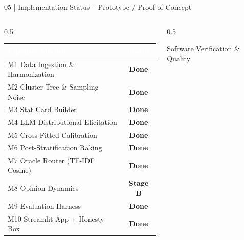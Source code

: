 \documentclass[10pt,aspectratio=169]{beamer}
\begin{document}
\begin{frame}{05 | Implementation Status -- Prototype / Proof-of-Concept}
    \scriptsize
    \begin{columns}[T]
        \begin{column}{0.5\textwidth}
            \renewcommand{\arraystretch}{1.1}
            \begin{table}
            \begin{tabularx}{\textwidth}{@{} >{\raggedright\arraybackslash}X c @{}}
                \toprule
                \rowcolor{HeaderNavy} \textcolor{white}{\textbf{Pipeline Module}} & \textcolor{white}{\textbf{Status}} \\
                \midrule
                \rowcolor{RowAlt} M1 Data Ingestion \& Harmonization & {\color{TLGreen}\textbf{Done}} \\
                M2 Cluster Tree \& Sampling Noise & {\color{TLGreen}\textbf{Done}} \\
                \rowcolor{RowAlt} M3 Stat Card Builder & {\color{TLGreen}\textbf{Done}} \\
                M4 LLM Distributional Elicitation & {\color{TLGreen}\textbf{Done}} \\
                \rowcolor{RowAlt} M5 Cross-Fitted Calibration & {\color{TLGreen}\textbf{Done}} \\
                M6 Post-Stratification Raking & {\color{TLGreen}\textbf{Done}} \\
                \rowcolor{RowAlt} M7 Oracle Router (TF-IDF Cosine) & {\color{TLGreen}\textbf{Done}} \\
                M8 Opinion Dynamics & {\color{TLOrange}\textbf{Stage B}} \\
                \rowcolor{RowAlt} M9 Evaluation Harness & {\color{TLGreen}\textbf{Done}} \\
                M10 Streamlit App + Honesty Box & {\color{TLGreen}\textbf{Done}} \\
                \bottomrule
            \end{tabularx}
            \end{table}
        \end{column}
        \begin{column}{0.5\textwidth}
            \begin{block}{Software Verification \& Quality}

\end{block}
\end{column}
\end{columns}
\end{frame}
\end{document}
